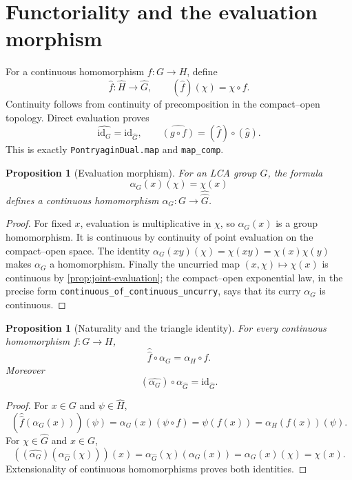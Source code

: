 \documentclass[11pt]{article}
\newtheorem{proposition}[theorem]{Proposition}
\theoremstyle{definition}
\theoremstyle{remark}
\newcommand{\id}{\mathrm{id}}
\newcommand{\dual}[1]{\widehat{#1}}
\newcommand{\bidual}[1]{\widehat{\widehat{#1}}}
\begin{document}
\section{Functoriality and the evaluation morphism}
\label{sec:evaluation}

For a continuous homomorphism $f:G\to H$, define
\[
  \dual f:\dual H\longrightarrow\dual G,
  \qquad (\dual f)(\chi)=\chi\circ f.
\]
Continuity follows from continuity of precomposition in the compact--open topology.
Direct evaluation proves
\[
  \dual{\id_G}=\id_{\dual G},\qquad
  \dual{(g\circ f)}=(\dual f)\circ(\dual g).
\]
This is exactly \texttt{PontryaginDual.map} and \texttt{map\_comp}.

\begin{proposition}[Evaluation morphism]
\label{prop:evaluation-map}
For an LCA group $G$, the formula
\[
  \alpha_G(x)(\chi)=\chi(x)
\]
defines a continuous homomorphism $\alpha_G:G\to\bidual G$.
\end{proposition}

\begin{proof}
For fixed $x$, evaluation is multiplicative in $\chi$, so $\alpha_G(x)$ is a group
homomorphism.  It is continuous by continuity of point evaluation on the compact--open
space.  The identity
$\alpha_G(xy)(\chi)=\chi(xy)=\chi(x)\chi(y)$ makes $\alpha_G$ a homomorphism.
Finally the uncurried map $(x,\chi)\mapsto\chi(x)$ is continuous by
\cref{prop:joint-evaluation}; the compact--open exponential law, in the precise form
\texttt{continuous\_of\_continuous\_uncurry}, says that its curry $\alpha_G$ is
continuous.
\end{proof}

\begin{proposition}[Naturality and the triangle identity]
\label{prop:naturality}
For every continuous homomorphism $f:G\to H$,
\begin{equation}
  \bidual f\circ\alpha_G=\alpha_H\circ f.
  \label{eq:naturality}
\end{equation}
Moreover
\begin{equation}
  (\dual{\alpha_G})\circ\alpha_{\dual G}=\id_{\dual G}.
  \label{eq:triangle}
\end{equation}
\end{proposition}

\begin{proof}
For $x\in G$ and $\psi\in\dual H$,
\[
 (\bidual f(\alpha_G(x)))(\psi)
 =\alpha_G(x)(\psi\circ f)=\psi(f(x))=\alpha_H(f(x))(\psi).
\]
For $\chi\in\dual G$ and $x\in G$,
\[
 ((\dual{\alpha_G})(\alpha_{\dual G}(\chi)))(x)
 =\alpha_{\dual G}(\chi)(\alpha_G(x))=\alpha_G(x)(\chi)=\chi(x).
\]
Extensionality of continuous homomorphisms proves both identities.
\end{proof}
\end{document}
